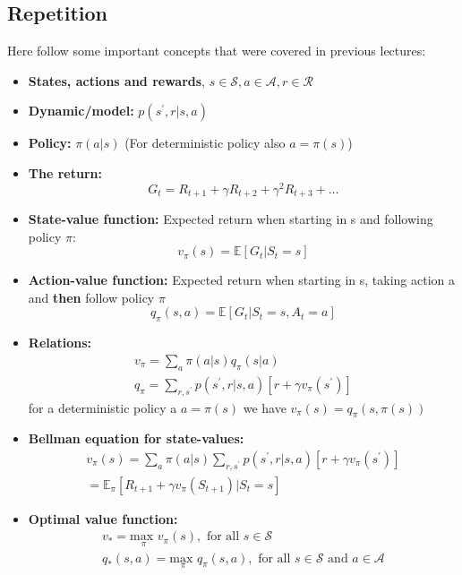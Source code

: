 \subsection*{Repetition}
Here follow some important concepts that were covered in previous lectures:

\begin{wbox}{}
\begin{itemize}
	\item \textbf{States, actions and rewards}, $s \in \mathcal{S}, a \in \mathcal{A}, r \in \mathcal{R}$
	\item \textbf{Dynamic/model:} $p(s^{\prime},r|s,a)$
	\item \textbf{Policy:} $\pi(a|s)$ (For deterministic policy also $a = \pi(s)$)
	\item \textbf{The return:} 
		\begin{equation}
			G_t = R_{t+1}+\gamma R_{t+2} + \gamma^{2}R_{t+3} + \ldots
		\end{equation}
	\item \textbf{State-value function:} Expected return when starting in s and following policy $\pi$: 
		\begin{equation}
			v_\pi(s) = \mathbb{E}[G_t | S_t =s]
		\end{equation}
	\item \textbf{Action-value function:} Expected return when starting in s, taking action a and \textbf{then} follow policy $\pi$ 
		\begin{equation}
			q_\pi(s,a) = \mathbb{E}[G_t | S_t = s, A_t = a]
		\end{equation}
	\item \textbf{Relations:} 
		\begin{equation}
		\begin{aligned}
			v_\pi = \sum_{a}^{} \pi(a|s) q_\pi(s|a) \\
			q_\pi = \sum_{r, s^{\prime}}^{} p(s^{\prime},r|s,a)[r + \gamma v_\pi(s^{\prime})] 
		\end{aligned}
		\end{equation}
		for a deterministic policy a $a = \pi(s)$ we have $v_\pi(s) = q_\pi(s, \pi(s))$
	\item \textbf{Bellman equation for state-values:}
		\begin{equation}
		\begin{aligned}
			v_\pi(s) = \sum_{a}^{} \pi (a|s) \sum_{r, s^{\prime}}^{} p(s^{\prime},r|s,a)[r + \gamma v_\pi(s^{\prime})] \\
			= \mathbb{E}_\pi [R_{t+1}+\gamma v_\pi(S_{t+1})|S_t = s] 
		\end{aligned}
		\end{equation}
	\item \textbf{Optimal value function:}
		\begin{equation}
		 \begin{aligned}
		 	v_* = \underset{\pi}{\text{max }} v_\pi(s), \text{ for all } s \in \mathcal{S} \\
		 	q_* (s,a) = \underset{\pi}{\text{max }}q_\pi(s,a), \text{ for all } s \in \mathcal{S} \text{ and } a \in \mathcal{A}
		 \end{aligned}
		 \end{equation} 


\end{itemize}
\end{wbox}
